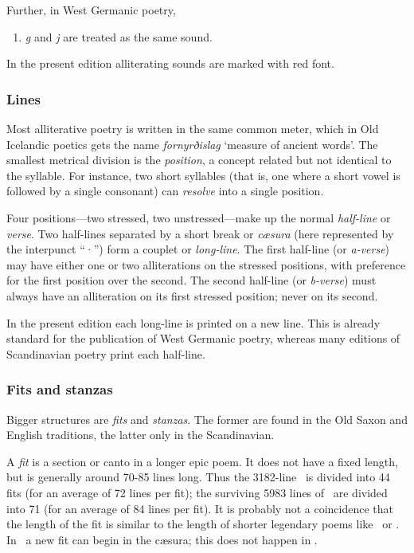     \noindent Further, in West Germanic poetry,

    \begin{enumerate}[4]
      \item \emph{g} and \emph{j} are treated as the same sound.
    \end{enumerate}

    In the present edition alliterating sounds are marked with red font.

    \subsubsection{Lines}
    Most alliterative poetry is written in the same common meter, which in Old Icelandic poetics gets the name \emph{fornyrðislag} ‘measure of ancient words’.  The smallest metrical division is the \emph{position}, a concept related but not identical to the syllable.  For instance, two short syllables (that is, one where a short vowel is followed by a single consonant) can \emph{resolve} into a single position.

    Four positions—two stressed, two unstressed—make up the normal \emph{half-line} or \emph{verse}.  Two half-lines separated by a short break or \emph{cæsura} (here represented by the interpunct “·”) form a couplet or \emph{long-line}.  The first half-line (or \emph{a-verse}) may have either one or two alliterations on the stressed positions, with preference for the first position over the second.  The second half-line (or \emph{b-verse}) must always have an alliteration on its first stressed position; never on its second.

    In the present edition each long-line is printed on a new line.  This is already standard for the publication of West Germanic poetry, whereas many editions of Scandinavian poetry print each half-line.

    \subsubsection{Fits and stanzas}
    Bigger structures are \emph{fits} and \emph{stanzas}.  The former are found in the Old Saxon and English traditions, the latter only in the Scandinavian.

    A \emph{fit} is a section or canto in a longer epic poem.  It does not have a fixed length, but is generally around 70-85 lines long.  Thus the 3182-line \Beowulf\ is divided into 44 fits (for an average of 72 lines per fit); the surviving 5983 lines of \Heliand\ are divided into 71 (for an average of 84 lines per fit).  It is probably not a coincidence that the length of the fit is similar to the length of shorter legendary poems like \GudrunOne\ or \Hildebrandslied.  In \Heliand\ a new fit can begin in the cæsura; this does not happen in \Beowulf.

